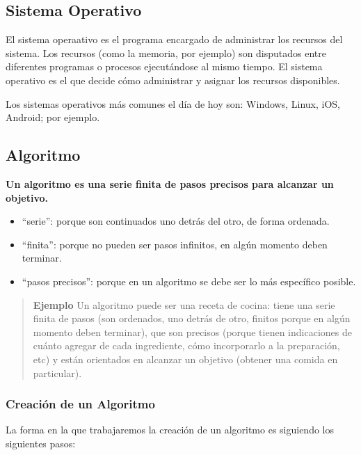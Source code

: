\documentclass[
  letterpaper,
  DIV=11,
  numbers=noendperiod]{scrreprt}
\providecommand{\tightlist}{%
  \setlength{\itemsep}{0pt}\setlength{\parskip}{0pt}}\usepackage{longtable,booktabs,array}
\begin{document}
\subsection{Sistema Operativo}\label{sistema-operativo}

El sistema operaativo es el programa encargado de administrar los
recursos del sistema. Los recursos (como la memoria, por ejemplo) son
disputados entre diferentes programas o procesos ejecutándose al mismo
tiempo. El sistema operativo es el que decide cómo administrar y asignar
los recursos disponibles.

Los sistemas operativos más comunes el día de hoy son: Windows, Linux,
iOS, Android; por ejemplo.

\subsection{Algoritmo}\label{algoritmo}

\textbf{Un algoritmo es una serie finita de pasos precisos para alcanzar
un objetivo.}

\begin{itemize}
\tightlist
\item
  ``serie'': porque son continuados uno detrás del otro, de forma
  ordenada.
\item
  ``finita'': porque no pueden ser pasos infinitos, en algún momento
  deben terminar.
\item
  ``pasos precisos'': porque en un algoritmo se debe ser lo más
  específico posible.
\end{itemize}

\begin{quote}
\textbf{Ejemplo} Un algoritmo puede ser una receta de cocina: tiene una
serie finita de pasos (son ordenados, uno detrás de otro, finitos porque
en algún momento deben terminar), que son precisos (porque tienen
indicaciones de cuánto agregar de cada ingrediente, cómo incorporarlo a
la preparación, etc) y están orientados en alcanzar un objetivo (obtener
una comida en particular).
\end{quote}

\subsubsection{Creación de un
Algoritmo}\label{creaciuxf3n-de-un-algoritmo}

La forma en la que trabajaremos la creación de un algoritmo es siguiendo
los siguientes pasos:
\end{document}
